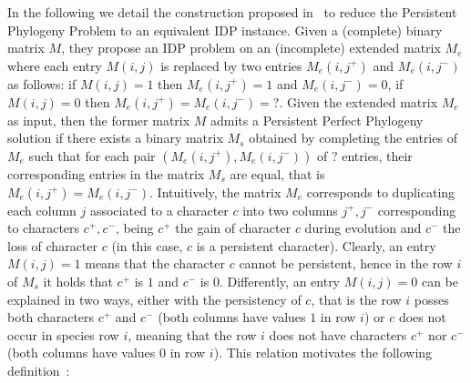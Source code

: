 \documentclass[a4paper,USenglish]{article}
\newcommand{\notaestesa}[2]{%
   \marginpar{\color{red!75!black}\textbf{\texttimes}}%
   {\color{red!75!black}%
     [\,\textbullet\,\textsf{\textbf{#1:}} %
     \textsf{\footnotesize#2}\,\textbullet\,]}%
 }
\theoremstyle{definition}
\begin{document}

In the following we detail the construction proposed in~\cite{BonizzoniBDT12}
to reduce the Persistent Phylogeny Problem to an equivalent IDP instance.
Given a (complete) binary matrix $M$, they propose an IDP problem
on an (incomplete) extended 
matrix $M_{e}$ where each entry $M(i,j)$ is replaced by two entries $M_{e}(i,j^{+})$ and
$M_{e}(i,j^{-})$ as follows: if $M(i,j)= 1$ then $M_{e}(i,j^{+}) = 1$ and
$M_{e}(i,j^{-}) = 0$,  if $M(i,j)= 0$ then $M_{e}(i,j^{+}) = M_{e}(i,j^{-}) = ?$.
Given the extended matrix $M_{e}$ as input, then the former matrix $M$
admits a  Persistent Perfect Phylogeny  solution if there exists a binary
matrix $M_s$ obtained  by completing the entries of  $M_{e}$ such that
for each pair $(M_{e}(i,j^{+}), M_{e}(i,j^{-}))$ of $?$ entries, 
 their corresponding entries in the matrix $M_{s}$ are equal, that is
 $M_{e}(i,j^{+}) = M_{e}(i,j^{-})$. 
Intuitively,  the  matrix  $M_{e}$  corresponds to  duplicating  each  column  $j$
associated to a character $c$ into two columns $j^{+}, j^{-}$ corresponding to
characters  $c^{+}, c^{-}$,  being  $c^{+}$  the gain  of  character $c$  during
evolution and $c^{-}$ the loss of character $c$ (in this case, $c$ is a persistent
character). 
Clearly, an entry $M(i,j)= 1$ means that the character $c$ cannot be persistent, hence in
the row $i$ of $M_s$ it holds that $c^+$ is $1$ and $c^-$ is $0$.
%
Differently, an  entry $M(i,j)= 0$ can  be explained in two  ways, either with
the persistency of $c$,  that is the row $i$ posses both  characters $c^+$ and $c^-$
(both columns  have  values $1$ in row $i$) or $c$ does  not occur in species row
$i$, meaning that the row $i$ does not  have characters $c^+$ nor $c^-$ (both columns
have values $0$ in row $i$).
This relation motivates the following definition~\cite{gusfield_persistent_2015}:
\end{document}
